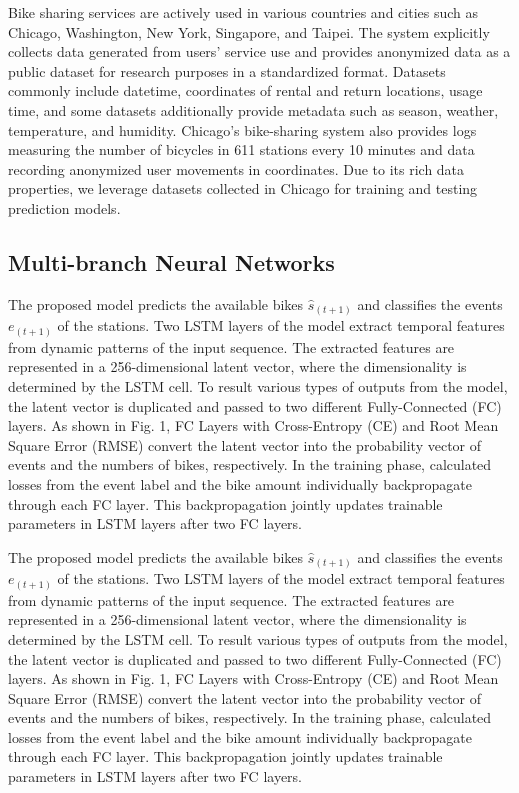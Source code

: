 \documentclass[conference]{IEEEtran}
\begin{document}
 Bike sharing services are actively used in various countries and cities such as Chicago, Washington, New York, Singapore, and Taipei. The system explicitly collects data generated from users' service use and provides anonymized data as a public dataset for research purposes in a standardized format. Datasets commonly include datetime, coordinates of rental and return locations, usage time, and some datasets additionally provide metadata such as season, weather, temperature, and humidity. Chicago's bike-sharing system also provides logs measuring the number of bicycles in 611 stations every 10 minutes and data recording anonymized user movements in coordinates. Due to its rich data properties, we leverage datasets collected in Chicago for training and testing prediction models.

\subsection{Multi-branch Neural Networks}
The proposed model predicts the available bikes $\hat{s}_(t+1)$ and classifies the events $e _(t+1)$ of the stations. Two LSTM layers of the model extract temporal features from dynamic patterns of the input sequence. The extracted features are represented in a 256-dimensional latent vector, where the dimensionality is determined by the LSTM cell. To result various types of outputs from the model, the latent vector is duplicated and passed to two different Fully-Connected (FC) layers. As shown in Fig. 1, FC Layers with Cross-Entropy (CE) and Root Mean Square Error (RMSE) convert the latent vector into the probability vector of events and the numbers of bikes, respectively. In the training phase, calculated losses from the event label and the bike amount individually backpropagate through each FC layer. This backpropagation jointly updates trainable parameters in LSTM layers after two FC layers.

 The proposed model predicts the available bikes $\hat{s}_(t+1)$ and classifies the events $e_(t+1)$ of the stations. Two LSTM layers of the model extract temporal features from dynamic patterns of the input sequence. The extracted features are represented in a 256-dimensional latent vector, where the dimensionality is determined by the LSTM cell. To result various types of outputs from the model, the latent vector is duplicated and passed to two different Fully-Connected (FC) layers. As shown in Fig. 1, FC Layers with Cross-Entropy (CE) and Root Mean Square Error (RMSE) convert the latent vector into the probability vector of events and the numbers of bikes, respectively. In the training phase, calculated losses from the event label and the bike amount individually backpropagate through each FC layer. This backpropagation jointly updates trainable parameters in LSTM layers after two FC layers.
\end{document}
